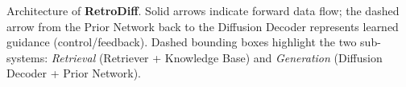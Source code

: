 \caption{Architecture of \textbf{RetroDiff}. Solid arrows indicate forward data flow; the dashed arrow from the Prior Network back to the Diffusion Decoder represents learned guidance (control/feedback). Dashed bounding boxes highlight the two sub-systems: \emph{Retrieval} (Retriever + Knowledge Base) and \emph{Generation} (Diffusion Decoder + Prior Network).}
